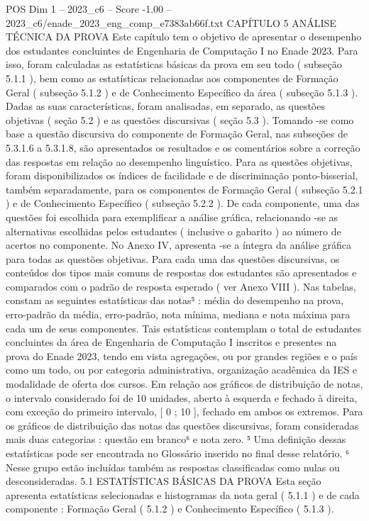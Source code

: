 \begin{textsample}{POS Dim 1 – 2023\_c6 – Score -1.00 – 2023\_c6/enade\_2023\_eng\_comp\_e7383ab66f.txt}  \label{ex:f1_pos_231}
CAPÍTULO 5 ANÁLISE TÉCNICA DA PROVA Este capítulo tem o objetivo de apresentar o desempenho dos estudantes concluintes de Engenharia de Computação I no Enade 2023.
Para isso, foram calculadas as estatísticas básicas da prova em seu todo ( subseção 5.1.1 ), bem como as estatísticas relacionadas aos componentes de Formação Geral ( subseção 5.1.2 ) e de Conhecimento Específico da área ( subseção 5.1.3 ).
Dadas as suas características, foram analisadas, em separado, as questões objetivas ( seção 5.2 ) e as questões discursivas ( seção 5.3 ).
Tomando -se como base a questão discursiva do componente de Formação Geral, nas subseções de 5.3.1.6 a 5.3.1.8, são apresentados os resultados e os comentários sobre a correção das respostas em relação ao desempenho linguístico.
Para as questões objetivas, foram disponibilizados os índices de facilidade e de discriminação ponto-bisserial, também separadamente, para os componentes de Formação Geral ( subseção 5.2.1 ) e de Conhecimento Específico ( subseção 5.2.2 ).
De cada componente, uma das questões foi escolhida para exemplificar a análise gráfica, relacionando -se as alternativas escolhidas pelos estudantes ( inclusive o gabarito ) ao número de acertos no componente.
No Anexo IV, apresenta -se a íntegra da análise gráfica para todas as questões objetivas.
Para cada uma das questões discursivas, os conteúdos dos tipos mais comuns de respostas dos estudantes são apresentados e comparados com o padrão de resposta esperado ( ver Anexo VIII ).
Nas tabelas, constam as seguintes estatísticas das notas⁵ : média do desempenho na prova, erro-padrão da média, erro-padrão, nota mínima, mediana e nota máxima para cada um de seus componentes.
Tais estatísticas contemplam o total de estudantes concluintes da área de Engenharia de Computação I inscritos e presentes na prova do Enade 2023, tendo em vista agregações, ou por grandes regiões e o país como um todo, ou por categoria administrativa, organização acadêmica da IES e modalidade de oferta dos cursos.
Em relação aos gráficos de distribuição de notas, o intervalo considerado foi de 10 unidades, aberto à esquerda e fechado à direita, com exceção do primeiro intervalo, [ 0 ; 10 ], fechado em ambos os extremos.
Para os gráficos de distribuição das notas das questões discursivas, foram consideradas mais duas categorias : questão em branco⁶ e nota zero. ⁵ Uma definição dessas estatísticas pode ser encontrada no Glossário inserido no final desse relatório. ⁶ Nesse grupo estão incluídas também as respostas classificadas como nulas ou desconsideradas. 5.1 ESTATÍSTICAS BÁSICAS DA PROVA Esta seção apresenta estatísticas selecionadas e histogramas da nota geral ( 5.1.1 ) e de cada componente : Formação Geral ( 5.1.2 ) e Conhecimento Específico ( 5.1.3 ).

\end{textsample}
